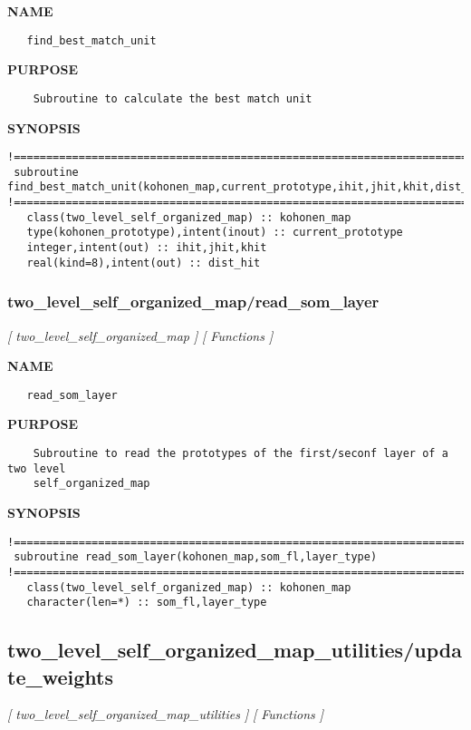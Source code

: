 \documentclass{article}
\begin{document}
\label{ch:robo59}
\label{ch:two_level_self_organized_map_find_best_match_unit}
\textbf{NAME}
\begin{verbatim}
   find_best_match_unit
\end{verbatim}
\textbf{PURPOSE}
\begin{verbatim}
    Subroutine to calculate the best match unit  
\end{verbatim}
\textbf{SYNOPSIS}
\begin{verbatim}
!========================================================================================
 subroutine find_best_match_unit(kohonen_map,current_prototype,ihit,jhit,khit,dist_hit)
!========================================================================================
   class(two_level_self_organized_map) :: kohonen_map
   type(kohonen_prototype),intent(inout) :: current_prototype
   integer,intent(out) :: ihit,jhit,khit
   real(kind=8),intent(out) :: dist_hit
\end{verbatim}
\newpage
\subsubsection{two\_level\_self\_organized\_map/read\_som\_layer}
\textsl{[ two\_level\_self\_organized\_map ]}
\textsl{[ Functions ]}

\label{ch:robo60}
\label{ch:two_level_self_organized_map_read_som_layer}
\textbf{NAME}
\begin{verbatim}
   read_som_layer
\end{verbatim}
\textbf{PURPOSE}
\begin{verbatim}
    Subroutine to read the prototypes of the first/seconf layer of a two level 
    self_organized_map 
\end{verbatim}
\textbf{SYNOPSIS}
\begin{verbatim}
!========================================================================================
 subroutine read_som_layer(kohonen_map,som_fl,layer_type)
!========================================================================================
   class(two_level_self_organized_map) :: kohonen_map
   character(len=*) :: som_fl,layer_type
\end{verbatim}
\newpage
\subsection{two\_level\_self\_organized\_map\_utilities/update\_weights}
\textsl{[ two\_level\_self\_organized\_map\_utilities ]}
\textsl{[ Functions ]}
\end{document}
